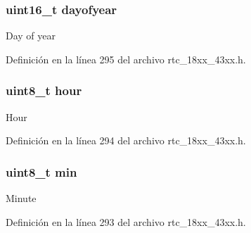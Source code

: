 \subsubsection[{\texorpdfstring{dayofyear}{dayofyear}}]{\setlength{\rightskip}{0pt plus 5cm}uint16\+\_\+t dayofyear}\hypertarget{struct_r_t_c___e_v___t_i_m_e_s_t_a_m_p___t_a65bcb2841671d5e78b73cdc973553d34}{}\label{struct_r_t_c___e_v___t_i_m_e_s_t_a_m_p___t_a65bcb2841671d5e78b73cdc973553d34}
Day of year 

Definición en la línea 295 del archivo rtc\+\_\+18xx\+\_\+43xx.\+h.

\subsubsection[{\texorpdfstring{hour}{hour}}]{\setlength{\rightskip}{0pt plus 5cm}uint8\+\_\+t hour}\hypertarget{struct_r_t_c___e_v___t_i_m_e_s_t_a_m_p___t_ae5af4ff48939d13d480f87e56a9385d6}{}\label{struct_r_t_c___e_v___t_i_m_e_s_t_a_m_p___t_ae5af4ff48939d13d480f87e56a9385d6}
Hour 

Definición en la línea 294 del archivo rtc\+\_\+18xx\+\_\+43xx.\+h.

\subsubsection[{\texorpdfstring{min}{min}}]{\setlength{\rightskip}{0pt plus 5cm}uint8\+\_\+t min}\hypertarget{struct_r_t_c___e_v___t_i_m_e_s_t_a_m_p___t_ac9b481208b43f7c37ed25e446bdec692}{}\label{struct_r_t_c___e_v___t_i_m_e_s_t_a_m_p___t_ac9b481208b43f7c37ed25e446bdec692}
Minute 

Definición en la línea 293 del archivo rtc\+\_\+18xx\+\_\+43xx.\+h.

